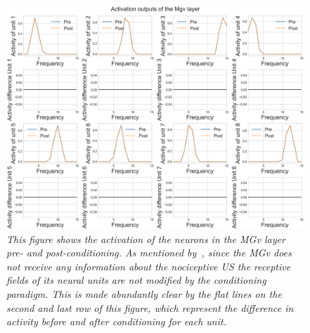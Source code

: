 \begin{figure}[!htbp]
   \begin{center}
      \includegraphics[width=\textwidth]{Figs/activation_mgv}
      \caption{\textit{This figure shows the activation of the neurons in the MGv layer pre- and post-conditioning. As mentioned by~\citet{Armony1995}, since the MGv does not receive any information about the nociceptive US the receptive fields of its neural units are not modified by the conditioning paradigm. This is made abundantly clear by the flat lines on the second and last row of this figure, which represent the difference in activity before and after conditioning for each unit.}}\label{fig:armony_act_mgv}
   \end{center}
\end{figure}

